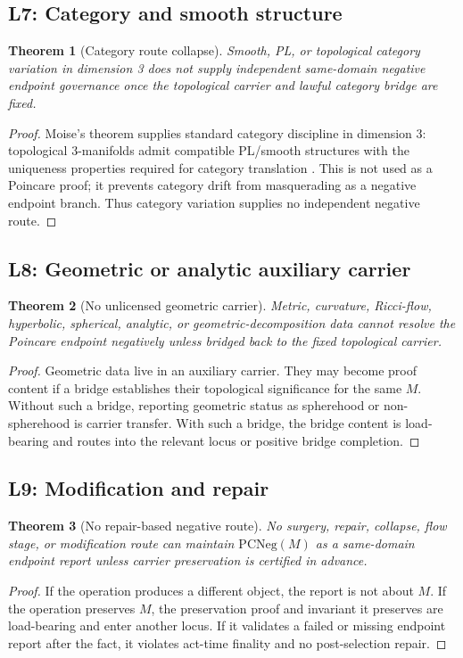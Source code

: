 \documentclass[11pt]{article}
\newtheorem{theorem}{Theorem}[section]
\newcommand{\PCNeg}{\mathrm{PCNeg}}
\begin{document}
\subsection{L7: Category and smooth structure}
\begin{theorem}[Category route collapse]
Smooth, PL, or topological category variation in dimension 3 does not supply independent same-domain negative endpoint governance once the topological carrier and lawful category bridge are fixed.
\end{theorem}
\begin{proof}
Moise's theorem supplies standard category discipline in dimension 3: topological 3-manifolds admit compatible PL/smooth structures with the uniqueness properties required for category translation \cite{Moise1977}. This is not used as a Poincare proof; it prevents category drift from masquerading as a negative endpoint branch. Thus category variation supplies no independent negative route.
\end{proof}

\subsection{L8: Geometric or analytic auxiliary carrier}
\begin{theorem}[No unlicensed geometric carrier]
Metric, curvature, Ricci-flow, hyperbolic, spherical, analytic, or geometric-decomposition data cannot resolve the Poincare endpoint negatively unless bridged back to the fixed topological carrier.
\end{theorem}
\begin{proof}
Geometric data live in an auxiliary carrier. They may become proof content if a bridge establishes their topological significance for the same \(M\). Without such a bridge, reporting geometric status as spherehood or non-spherehood is carrier transfer. With such a bridge, the bridge content is load-bearing and routes into the relevant locus or positive bridge completion.
\end{proof}

\subsection{L9: Modification and repair}
\begin{theorem}[No repair-based negative route]
No surgery, repair, collapse, flow stage, or modification route can maintain \(\PCNeg(M)\) as a same-domain endpoint report unless carrier preservation is certified in advance.
\end{theorem}
\begin{proof}
If the operation produces a different object, the report is not about \(M\). If the operation preserves \(M\), the preservation proof and invariant it preserves are load-bearing and enter another locus. If it validates a failed or missing endpoint report after the fact, it violates act-time finality and no post-selection repair.
\end{proof}
\end{document}
